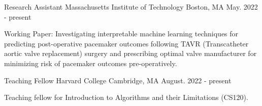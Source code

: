 
\begin{cventries}

  \cventry
    {Research Assistant} %
    {Massachusetts Institute of Technology} %
    {Boston, MA} %
    {May. 2022 - present} %
    {
      \begin{cvitems} %
        \item {Working Paper: Investigating interpretable machine learning techniques for 
        predicting post-operative pacemaker outcomes following TAVR
        (Transcatheter aortic valve replacement) surgery and prescribing optimal 
        valve manufacturer for minimizing risk of pacemaker outcomes pre-operatively.}
      \end{cvitems}
    }

\cventry
    {Teaching Fellow} %
    {Harvard College} %
    {Cambridge, MA} %
    {August. 2022 - present} %
    {
      \begin{cvitems} %
        \item {Teaching fellow for Introduction to Algorithms and their Limitations (CS120).}
      \end{cvitems}
    }



\end{cventries}
